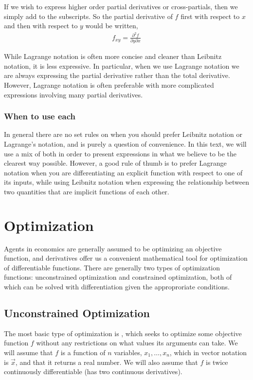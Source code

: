 If we wish to express higher order partial derivatives or cross-partials, then we simply add to the subscripts. So the partial derivative of $f$ first with respect to $x$ and then with respect to $y$ would be written,
\begin{align*}
    f_{xy} = \frac{\partial^2 f}{\partial y \partial x}
\end{align*}

While Lagrange notation is often more concise and cleaner than Leibnitz notation, it is less expressive. In particular, when we use Lagrange notation we are always expressing the partial derivative rather than the total derivative. However, Lagrange notation is often preferable with more complicated expressions involving many partial derivatives. 

\subsubsection*{When to use each}
In general there are no set rules on when you should prefer Leibnitz notation or Lagrange's notation, and is purely a question of convenience. In this text, we will use a mix of both in order to present expressions in what we believe to be the clearest way possible. However, a good rule of thumb is to prefer Lagrange notation when you are differentiating an explicit function with respect to one of its inputs, while using Leibnitz notation when expressing the relationship between two quantities that are implicit functions of each other. 

\section{Optimization}
Agents in economics are generally assumed to be optimizing an objective function, and derivatives offer us a convenient mathematical tool for optimization of differentiable functions. There are generally two types of optimization functions: unconstrained optimization and constrained optimization, both of which can be solved with differentiation given the approproriate conditions.

\subsection*{Unconstrained Optimization}
The most basic type of optimization is , which seeks to optimize some objective function $f$ without any restrictions on what values its arguments can take. We will assume that $f$ is a function of $n$ variables, $x_1, \dots, x_n$, which in vector notation is $\vec{x}$, and that it returns a real number. We will also assume that $f$ is twice continuously differentiable (has two continuous derivatives). 

